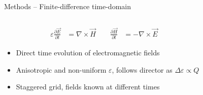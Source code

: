 \documentclass{beamer}
\newlength{\wideitemsep}
\let\olditem\item
\renewcommand{\item}{\setlength{\itemsep}{\wideitemsep}\olditem}
\newcommand{\odvod}[2]{\frac{\partial #1}{\partial #2}}
\begin{document}
\begin{frame}{Methods -- Finite-difference time-domain}
\begin{columns}
  \begin{column}{.6\textwidth}

\begin{block}{}
  \vspace{-25pt}
  \begin{align*}
      \varepsilon \odvod{\vec E}{t} &= \nabla \times \vec H \qquad
      \odvod{\vec H}{t} &= -\nabla \times \vec E
  \end{align*}
\end{block}

\begin{block}{}
 \begin{itemize}
  \item Direct time evolution of electromagnetic fields
  \item Anisotropic and non-uniform $\varepsilon$, follows director as $\Delta\varepsilon\propto Q$
  \item Staggered grid, fields known at different times
\end{itemize}
\end{block}
    
  \end{column}

  \begin{column}{.35\textwidth}
\begin{block}{}
  \vspace{-25pt}
  \begin{figure}[h]
\centering
 \subfigure{
\begin{tikzpicture}[scale=.92]
    

\end{tikzpicture}}
\end{figure}
\end{block}
\end{column}
\end{columns}
\end{frame}
\end{document}
